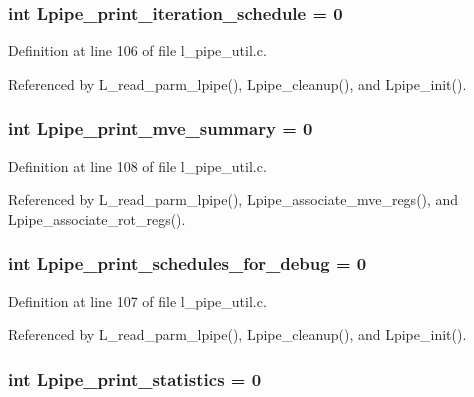\subsubsection{\setlength{\rightskip}{0pt plus 5cm}int \bf{Lpipe\_\-print\_\-iteration\_\-schedule} = 0}\label{l__pipe__util_8c_f65026de9f77648de4df3b4f4ec74417}




Definition at line 106 of file l\_\-pipe\_\-util.c.

Referenced by L\_\-read\_\-parm\_\-lpipe(), Lpipe\_\-cleanup(), and Lpipe\_\-init().
\subsubsection{\setlength{\rightskip}{0pt plus 5cm}int \bf{Lpipe\_\-print\_\-mve\_\-summary} = 0}\label{l__pipe__util_8c_39d6ce980c9450094cb1c9372292b9ac}




Definition at line 108 of file l\_\-pipe\_\-util.c.

Referenced by L\_\-read\_\-parm\_\-lpipe(), Lpipe\_\-associate\_\-mve\_\-regs(), and Lpipe\_\-associate\_\-rot\_\-regs().
\subsubsection{\setlength{\rightskip}{0pt plus 5cm}int \bf{Lpipe\_\-print\_\-schedules\_\-for\_\-debug} = 0}\label{l__pipe__util_8c_0b64713f1a54406156072dd81814ea25}




Definition at line 107 of file l\_\-pipe\_\-util.c.

Referenced by L\_\-read\_\-parm\_\-lpipe(), Lpipe\_\-cleanup(), and Lpipe\_\-init().
\subsubsection{\setlength{\rightskip}{0pt plus 5cm}int \bf{Lpipe\_\-print\_\-statistics} = 0}\label{l__pipe__util_8c_ab2140575cdf9b3526e6da5ea095a784}




